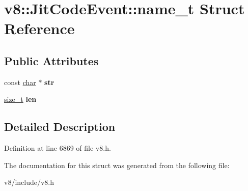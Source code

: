 \hypertarget{structv8_1_1JitCodeEvent_1_1name__t}{}\section{v8\+:\+:Jit\+Code\+Event\+:\+:name\+\_\+t Struct Reference}
\label{structv8_1_1JitCodeEvent_1_1name__t}
\subsection*{Public Attributes}
\begin{DoxyCompactItemize}
\item 
\mbox{\label{structv8_1_1JitCodeEvent_1_1name__t_a344732b4289a6a1fd21bb577ac9eff15}} 
const \mbox{\hyperlink{classchar}{char}} $\ast$ {\bfseries str}
\item 
\mbox{\label{structv8_1_1JitCodeEvent_1_1name__t_aa85ddd240f3b08c995caa8267ee8c586}} 
\mbox{\hyperlink{classsize__t}{size\+\_\+t}} {\bfseries len}
\end{DoxyCompactItemize}


\subsection{Detailed Description}


Definition at line 6869 of file v8.\+h.



The documentation for this struct was generated from the following file\+:\begin{DoxyCompactItemize}
\item 
v8/include/v8.\+h\end{DoxyCompactItemize}
